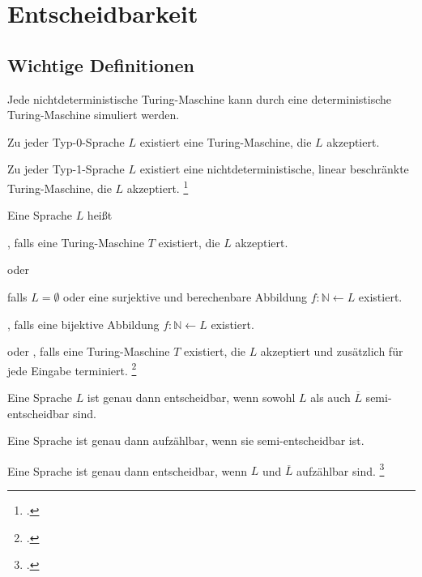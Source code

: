 \documentclass{lehramt-informatik-haupt}
\begin{document}

\chapter{Entscheidbarkeit}

\section{Wichtige Definitionen}

Jede nichtdeterministische Turing-Maschine kann durch eine
deterministische Turing-Maschine simuliert werden.

Zu jeder Typ-0-Sprache $L$ existiert eine Turing-Maschine, die $L$
akzeptiert.

Zu jeder Typ-1-Sprache $L$ existiert eine nichtdeterministische, linear
beschränkte Turing-Maschine, die $L$ akzeptiert.
\footcite[Seite 35]{theo:fs:4}

Eine Sprache $L$ heißt

, falls eine Turing-Maschine $T$ existiert,
die $L$ akzeptiert.

oder

falls $L = \emptyset$ oder eine surjektive und berechenbare Abbildung
$f: \mathbb{N} \leftarrow L$ existiert.

, falls eine bijektive Abbildung $f: \mathbb{N}
\leftarrow L$ existiert.

 oder , falls eine Turing-Maschine
$T$ existiert, die $L$ akzeptiert und zusätzlich für jede Eingabe
terminiert.
\footcite[Seite 37]{theo:fs:4}

Eine Sprache $L$ ist genau dann entscheidbar, wenn sowohl $L$ als auch $\overline{L}$
semi-entscheidbar sind.

Eine Sprache ist genau dann aufzählbar, wenn sie semi-entscheidbar ist.

Eine Sprache ist genau dann entscheidbar, wenn $L$ und $\overline{L}$
aufzählbar sind.
\footcite[Seite 39]{theo:fs:4}
\end{document}
